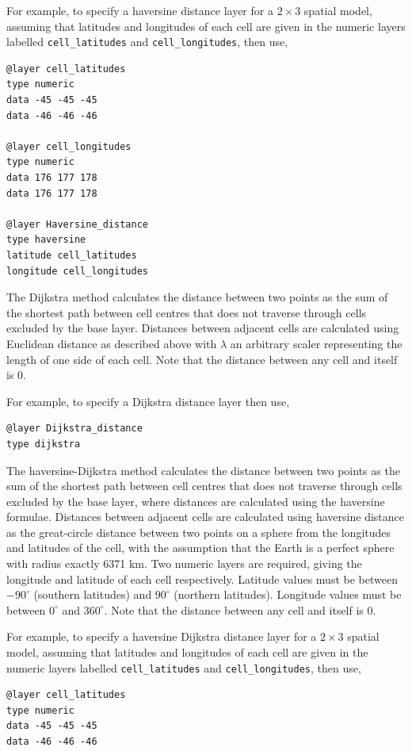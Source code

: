 \begin{enumerate}
For example, to specify a haversine distance layer for a $2\times3$ spatial model, assuming that latitudes and longitudes of each cell are given in the numeric layers labelled \texttt{cell\_latitudes} and \texttt{cell\_longitudes}, then use,
{\small{\begin{verbatim}
@layer cell_latitudes
type numeric
data -45 -45 -45
data -46 -46 -46

@layer cell_longitudes
type numeric
data 176 177 178
data 176 177 178

@layer Haversine_distance
type haversine
latitude cell_latitudes
longitude cell_longitudes
\end{verbatim}}}

The Dijkstra method calculates the distance between two points as the sum of the shortest path between cell centres that does not traverse through cells excluded by the base layer. Distances between adjacent cells are calculated using Euclidean distance as described above with $\lambda$ an arbitrary scaler representing the length of one side of each cell. Note that the distance between any cell and itself is 0.

For example, to specify a Dijkstra distance layer then use,

{\small{\begin{verbatim}
@layer Dijkstra_distance
type dijkstra
\end{verbatim}}}

The haversine-Dijkstra method calculates the distance between two points as the sum of the shortest path between cell centres that does not traverse through cells excluded by the base layer, where distances are calculated using the haversine formulae. Distances between adjacent cells are calculated using haversine distance as the great-circle distance between two points on a sphere from the longitudes and latitudes of the cell, with the assumption that the Earth is a perfect sphere with radius exactly 6371 km. Two numeric layers are required, giving the longitude and latitude of each cell respectively. Latitude values must be between $-90^{\circ}$ (southern latitudes) and $90^{\circ}$ (northern latitudes). Longitude values must be between $0^{\circ}$ and $360^{\circ}$. Note that the distance between any cell and itself is 0.

For example, to specify a haversine Dijkstra distance layer for a $2\times3$ spatial model, assuming that latitudes and longitudes of each cell are given in the numeric layers labelled \texttt{cell\_latitudes} and \texttt{cell\_longitudes}, then use,
{\small{\begin{verbatim}
@layer cell_latitudes
type numeric
data -45 -45 -45
data -46 -46 -46


\end{verbatim}}}
\end{enumerate}
